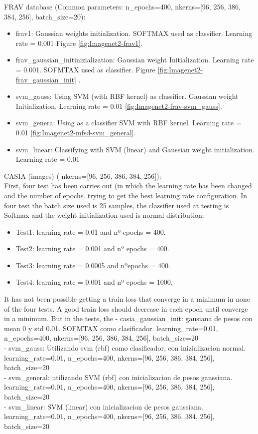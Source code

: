 FRAV database (Common parameters:  n\_epochs=400, nkerns=[96, 256, 386, 384, 256], batch\_size=20):\\
\begin{itemize}
\item frav1: Gaussian weights initialization. SOFTMAX used as classifier. Learning rate = 0.001 Figure \ref{fig:Imagenet2-frav1}.
\item  frav\_gaussian\_initinizialization: Gaussian weight Initialization. Learning rate = 0.001. SOFMTAX used as classifier. Figure \ref{fig:Imagenet2-frav_gaussian_init} .
\item svm\_gauss: Using SVM (with RBF kernel) as classifier. Gaussian weight Initialization. Learning rate = 0.01 \ref{fig:Imagenet2-frav-svm_gauss}.
\item svm\_genera: Using as a classifier SVM with RBF kernel. Learning rate = 0.01 \ref{fig:Imagenet2-mfsd-svm_general}.
\item svm\_linear: Classifying with SVM (linear) and Gaussian weight initialization. Learning rate = 0.01\\
\end{itemize}

CASIA (images) ( nkerns=[96, 256, 386, 384, 256]):\\
First, four test has been carries out (in which the learning rate has been changed and the number of epochs. trying to get the best learning rate configuration. In four test the batch size used is 25 samples, the classifier used at testing is Softmax and the weight initialization used is normal distribution:

\begin{itemize} [noitemsep,topsep=8pt,parsep=0pt,partopsep=20pt]
\item Test1: learning rate = 0.01 and nº epochs = 400.
\item Test2: learning rate = 0.001 and nº epochs = 400.
\item Test3: learning rate = 0.0005 and nºepochs = 400.
\item Test4: learning rate = 0.001 and nº epochs = 1000,
\end{itemize}

It has not been possible getting a train loss that converge in a minimum in none of the four tests. A good train loss should decrease in each epoch until converge in a minimum. But in the tests, the
- casia\_gaussian\_init: gausiana de pesos con mean 0 y std 0.01. SOFMTAX como clasificador. learning\_rate=0.01, n\_epochs=400, nkerns=[96, 256, 386, 384, 256], batch\_size=20 \\
- svm\_gauss: Utilizando svm (rbf) como clasificador, con inizializacion normal. learning\_rate=0.01, n\_epochs=400, nkerns=[96, 256, 386, 384, 256], batch\_size=20\\
- svm\_general: utilizando SVM (rbf) con inicializacion de pesos gaussiana. learning\_rate=0.01, n\_epochs=400, nkerns=[96, 256, 386, 384, 256], batch\_size=20\\
- svm\_linear: SVM (linear) con inicializacion de pesos gaussiana. learning\_rate=0.01, n\_epochs=400, nkerns=[96, 256, 386, 384, 256], batch\_size=20\\

